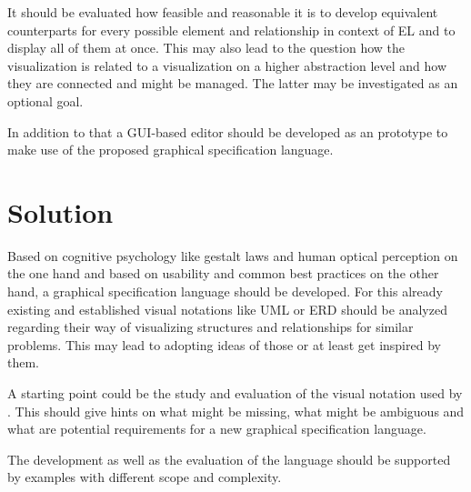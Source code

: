 \documentclass[12pt,a4paper]{article}
\begin{document}
It should be evaluated how feasible and reasonable it is to develop equivalent counterparts for every possible element and relationship in context of EL and to display all of them at once.
This may also lead to the question how the visualization is related to a visualization on a higher abstraction level and how they are connected and might be managed.
The latter may be investigated as an optional goal.

In addition to that a GUI-based editor should be developed as an prototype to make use of the proposed graphical specification language.

\section{Solution} 
Based on cognitive psychology like gestalt laws and human optical perception on the one hand and based on usability and common best practices on the other hand, a graphical specification language should be developed.
For this already existing and established visual notations like UML or ERD should be analyzed regarding their way of visualizing structures and relationships for similar problems.
This may lead to adopting ideas of those or at least get inspired by them.

A starting point could be the study and evaluation of the visual notation used by \cite{Amthor18}.
This should give hints on what might be missing, what might be ambiguous and what are potential requirements for a new graphical specification language.

The development as well as the evaluation of the language should be supported by examples with different scope and complexity.




 
\end{document}
